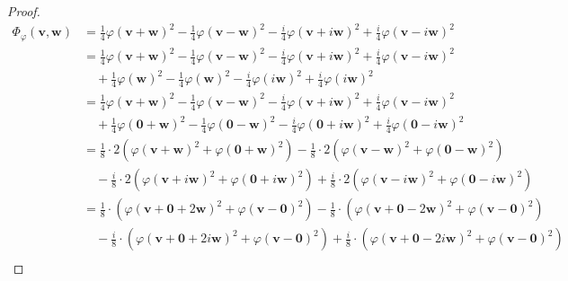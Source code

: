 \documentclass[dvipdfmx]{jsarticle}
\begin{document}
\begin{proof}
\begin{align*}
\varPhi_{\varphi}\left( \mathbf{v},\mathbf{w} \right) &= \frac{1}{4}{\varphi\left( \mathbf{v} + \mathbf{w} \right)}^{2} - \frac{1}{4}{\varphi\left( \mathbf{v} - \mathbf{w} \right)}^{2} - \frac{i}{4}{\varphi\left( \mathbf{v} + i\mathbf{w} \right)}^{2} + \frac{i}{4}{\varphi\left( \mathbf{v} - i\mathbf{w} \right)}^{2}\\
&= \frac{1}{4}{\varphi\left( \mathbf{v} + \mathbf{w} \right)}^{2} - \frac{1}{4}{\varphi\left( \mathbf{v} - \mathbf{w} \right)}^{2} - \frac{i}{4}{\varphi\left( \mathbf{v} + i\mathbf{w} \right)}^{2} + \frac{i}{4}{\varphi\left( \mathbf{v} - i\mathbf{w} \right)}^{2} \\
&\quad + \frac{1}{4}{\varphi\left( \mathbf{w} \right)}^{2} - \frac{1}{4}{\varphi\left( \mathbf{w} \right)}^{2} - \frac{i}{4}{\varphi\left( i\mathbf{w} \right)}^{2} + \frac{i}{4}{\varphi\left( i\mathbf{w} \right)}^{2}\\
&= \frac{1}{4}{\varphi\left( \mathbf{v} + \mathbf{w} \right)}^{2} - \frac{1}{4}{\varphi\left( \mathbf{v} - \mathbf{w} \right)}^{2} - \frac{i}{4}{\varphi\left( \mathbf{v} + i\mathbf{w} \right)}^{2} + \frac{i}{4}{\varphi\left( \mathbf{v} - i\mathbf{w} \right)}^{2} \\
&\quad + \frac{1}{4}{\varphi\left( \mathbf{0} + \mathbf{w} \right)}^{2} - \frac{1}{4}{\varphi\left( \mathbf{0} - \mathbf{w} \right)}^{2} - \frac{i}{4}{\varphi\left( \mathbf{0} + i\mathbf{w} \right)}^{2} + \frac{i}{4}{\varphi\left( \mathbf{0} - i\mathbf{w} \right)}^{2}\\
&= \frac{1}{8} \cdot 2\left( {\varphi\left( \mathbf{v} + \mathbf{w} \right)}^{2} + {\varphi\left( \mathbf{0} + \mathbf{w} \right)}^{2} \right) - \frac{1}{8} \cdot 2\left( {\varphi\left( \mathbf{v} - \mathbf{w} \right)}^{2} + {\varphi\left( \mathbf{0} - \mathbf{w} \right)}^{2} \right) \\
&\quad - \frac{i}{8} \cdot 2\left( {\varphi\left( \mathbf{v} + i\mathbf{w} \right)}^{2} + {\varphi\left( \mathbf{0} + i\mathbf{w} \right)}^{2} \right) + \frac{i}{8} \cdot 2\left( {\varphi\left( \mathbf{v} - i\mathbf{w} \right)}^{2} + {\varphi\left( \mathbf{0} - i\mathbf{w} \right)}^{2} \right)\\
&= \frac{1}{8} \cdot \left( {\varphi\left( \mathbf{v} + \mathbf{0} + 2\mathbf{w} \right)}^{2} + {\varphi\left( \mathbf{v} - \mathbf{0} \right)}^{2} \right) - \frac{1}{8} \cdot \left( {\varphi\left( \mathbf{v} + \mathbf{0} - 2\mathbf{w} \right)}^{2} + {\varphi\left( \mathbf{v} - \mathbf{0} \right)}^{2} \right) \\
&\quad - \frac{i}{8} \cdot \left( {\varphi\left( \mathbf{v} + \mathbf{0} + 2i\mathbf{w} \right)}^{2} + {\varphi\left( \mathbf{v} - \mathbf{0} \right)}^{2} \right) + \frac{i}{8} \cdot \left( {\varphi\left( \mathbf{v} + \mathbf{0} - 2i\mathbf{w} \right)}^{2} + {\varphi\left( \mathbf{v} - \mathbf{0} \right)}^{2} \right)\\

\end{align*}
\end{proof}
\end{document}
